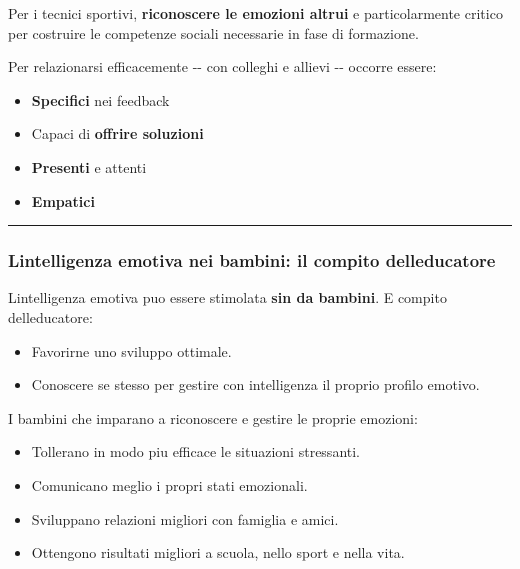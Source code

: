 \documentclass[a4paper,11pt]{article}
\providecommand{\tightlist}{%
  \setlength{\itemsep}{0pt}\setlength{\parskip}{0pt}}
\begin{document}
Per i tecnici sportivi, \textbf{riconoscere le emozioni altrui} e
particolarmente critico per costruire le competenze sociali necessarie
in fase di formazione.

Per relazionarsi efficacemente -\/- con colleghi e allievi -\/- occorre
essere:

\begin{itemize}
      \tightlist
      \item
            \textbf{Specifici} nei feedback
      \item
            Capaci di \textbf{offrire soluzioni}
      \item
            \textbf{Presenti} e attenti
      \item
            \textbf{Empatici}
\end{itemize}

\begin{center}\rule{0.5\linewidth}{0.5pt}\end{center}

\subsubsection{L\textquotesingle intelligenza emotiva nei bambini: il
      compito
      dell\textquotesingle educatore}\label{lintelligenza-emotiva-nei-bambini-il-compito-delleducatore}

L\textquotesingle intelligenza emotiva puo essere stimolata \textbf{sin
      da bambini}. E compito dell\textquotesingle educatore:

\begin{itemize}
      \tightlist
      \item
            Favorirne uno sviluppo ottimale.
      \item
            Conoscere se stesso per gestire con intelligenza il proprio profilo
            emotivo.
\end{itemize}

I bambini che imparano a riconoscere e gestire le proprie emozioni:

\begin{itemize}
      \tightlist
      \item
            Tollerano in modo piu efficace le situazioni stressanti.
      \item
            Comunicano meglio i propri stati emozionali.
      \item
            Sviluppano relazioni migliori con famiglia e amici.
      \item
            Ottengono risultati migliori a scuola, nello sport e nella vita.
\end{itemize}
\end{document}
